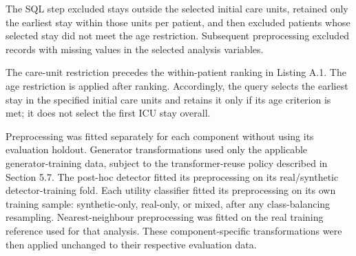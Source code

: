 The SQL step excluded stays outside the selected initial care units,
retained only the earliest stay within those units per patient, and then
excluded patients whose selected stay did not meet the age restriction.
Subsequent preprocessing excluded records with missing values in the
selected analysis variables.

%
%
The care-unit restriction precedes the within-patient ranking in Listing A.1.
The age restriction is applied after ranking. Accordingly, the query selects
the earliest stay in the specified initial care units and retains it only
if its age criterion is met; it does not select the first ICU stay overall.

Preprocessing was fitted separately for each component without using its
evaluation holdout. Generator transformations used only the applicable
generator-training data, subject to the transformer-reuse policy described
in Section 5.7. The post-hoc detector fitted its preprocessing on its
real/synthetic detector-training fold. Each utility classifier fitted its
preprocessing on its own training sample: synthetic-only, real-only, or
mixed, after any class-balancing resampling. Nearest-neighbour preprocessing
was fitted on the real training reference used for that analysis. These
component-specific transformations were then applied unchanged to their
respective evaluation data.

%

